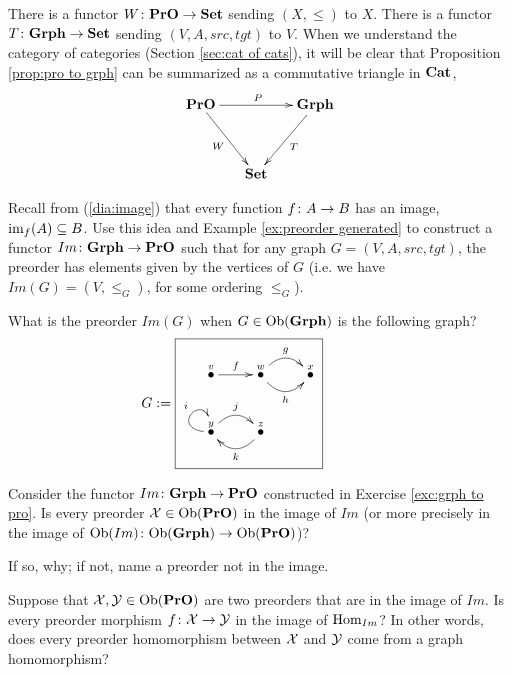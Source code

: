 \documentclass[CT4S-EN-RU]{subfiles}
\begin{document}
\begin{exerciseRUS}
\end{exerciseRUS}

\begin{remarkENG}
There is a functor $W\colon{\bf PrO}\rightarrow{\bf Set}$ sending $(X,\leq)$ to $X$. There is a functor $T\colon{\bf Grph}\rightarrow{\bf Set}$ sending $(V,A,src,tgt)$ to $V$. When we understand the category of categories (Section \ref{sec:cat of cats}), it will be clear that Proposition \ref{prop:pro to grph} can be summarized as a commutative triangle in ${\bf Cat}$, 
$$
\xymatrix@=15pt{\PrO\ar[rr]^P\ar[ddr]_W&&\Grph\ar[ddl]^T\\\\&\Set}
$$
\end{remarkENG}

\begin{remarkRUS}
\end{remarkRUS}

\begin{exerciseENG}\label{exc:grph to pro}
Recall from (\ref{dia:image}) that every function $f\colon A\rightarrow B$ has an image, $\textnormal{im}_f(A)\subseteq B$. Use this idea and Example \ref{ex:preorder generated} to construct a functor $Im\colon{\bf Grph}\rightarrow{\bf PrO}$ such that for any graph $G=(V,A,src,tgt)$, the preorder has elements given by the vertices of $G$ (i.e. we have $Im(G)=(V,\leq_G)$, for some ordering $\leq_G$).
\end{exerciseENG}

\begin{exerciseRUS}\label{exc:grph to pro}
\end{exerciseRUS}

\begin{exerciseENG}
What is the preorder $Im(G)$ when $G\in\textnormal{Ob}({\bf Grph})$ is the following graph?
$$
G:=\parbox{2in}{\fbox{\xymatrix{\LMO{v}\ar[r]^f&\LMO{w}\ar@/_1pc/[r]_h\ar@/^1pc/[r]^g&\LMO{x}\\\LMO{y}\ar@(l,u)[]^i\ar@/^1pc/[r]^j&\LMO{z}\ar@/^1pc/[l]^k}}}
$$
\end{exerciseENG}

\begin{exerciseRUS}
\end{exerciseRUS}

\begin{exerciseENG}
Consider the functor $Im\colon{\bf Grph}\rightarrow{\bf PrO}$ constructed in Exercise \ref{exc:grph to pro}.
\sexc Is every preorder $\mathcal{X}\in\textnormal{Ob}({\bf PrO})$ in the image of $Im$ (or more precisely in the image of $\textnormal{Ob}(Im)\colon\textnormal{Ob}({\bf Grph})\rightarrow\textnormal{Ob}({\bf PrO})$)?
\item If so, why; if not, name a preorder not in the image.
\item Suppose that $\mathcal{X},\mathcal{Y}\in\textnormal{Ob}({\bf PrO})$ are two preorders that are in the image of $Im$. Is every preorder morphism $f\colon\mathcal{X}\rightarrow\mathcal{Y}$ in the image of $\textnormal{Hom}_{Im}$? In other words, does every preorder homomorphism between $\mathcal{X}$ and $\mathcal{Y}$ come from a graph homomorphism?
\endsexc
\end{exerciseENG}
\end{document}

